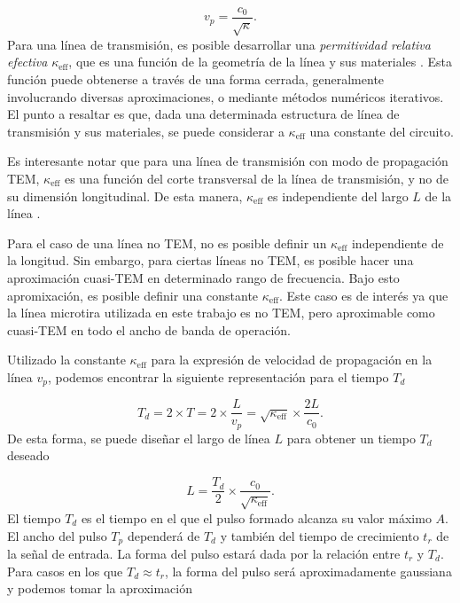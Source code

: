 \begin{equation}
  v_p = \frac{c_0}{\sqrt{\kappa}}.
\end{equation}
Para una línea de transmisión, es posible desarrollar una \textit{permitividad
relativa efectiva} $\kappa_{\text{eff}}$, que es una función de la geometría de
la línea y sus materiales \cite{pozar2011}. Esta función puede obtenerse a
través de una forma cerrada, generalmente involucrando diversas aproximaciones,
o mediante métodos numéricos iterativos. El punto a resaltar es que, dada una
determinada estructura de línea de transmisión y sus materiales, se puede
considerar a $\kappa_{\text{eff}}$ una constante del circuito.

Es interesante notar que para una línea de transmisión con modo de propagación
TEM, $\kappa_{\text{eff}}$ es una función del corte transversal de la línea de
transmisión, y no de su dimensión longitudinal. De esta manera,
$\kappa_{\text{eff}}$ es independiente del largo $L$ de la línea
\cite{pozar2011}.

Para el caso de una línea no TEM, no es posible definir un $\kappa_{\text{eff}}$
independiente de la longitud. Sin embargo, para ciertas líneas no TEM, es
posible hacer una aproximación cuasi-TEM en determinado rango de frecuencia.
Bajo esto apromixación, es posible definir una constante $\kappa_{\text{eff}}$.
Este caso es de interés ya que la línea microtira utilizada en este trabajo es
no TEM, pero aproximable como cuasi-TEM en todo el ancho de banda de operación.

Utilizado la constante $\kappa_{\text{eff}}$ para la expresión de velocidad de
propagación en la línea $v_p$, podemos encontrar la siguiente representación
para el tiempo $T_d$

\begin{equation}
    T_d = 2 \times T = 2 \times \frac{L}{v_p} =\sqrt{\kappa_{\text{eff}}}
    \times \frac{2L}{c_0}.
\end{equation}
De esta forma, se puede diseñar el largo de línea $L$ para obtener un tiempo
$T_d$ deseado

\begin{equation}
    \label{eq:stub_length_vs_delay}
    L = \frac{T_d}{2} \times \frac{c_0}{\sqrt{\kappa_{\text{eff}}}}.
\end{equation}
El tiempo $T_d$ es el tiempo en el que el pulso formado alcanza su valor máximo
$A$. El ancho del pulso $T_p$ dependerá de $T_d$ y también del tiempo de
crecimiento $t_r$ de la señal de entrada. La forma del pulso estará dada por la
relación entre $t_r$ y $T_d$. Para casos en los que $T_d \approx t_r$, la forma
del pulso será aproximadamente gaussiana y podemos tomar la aproximación

